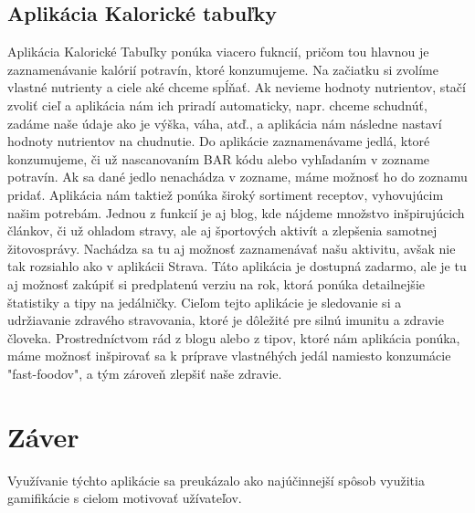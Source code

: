 \documentclass[10pt,twoside,slovak,a4paper]{article}
\begin{document}
\subsection{Aplikácia Kalorické tabuľky}
Aplikácia Kalorické Tabuľky ponúka viacero fukncií, pričom tou hlavnou je zaznamenávanie kalórií potravín, ktoré konzumujeme. Na začiatku si zvolíme vlastné nutrienty a ciele aké chceme spĺňať. Ak nevieme hodnoty nutrientov, stačí zvoliť cieľ a aplikácia nám ich priradí automaticky, napr. chceme schudnúť, zadáme naše údaje ako je výška, váha, atď., a aplikácia nám následne nastaví hodnoty nutrientov na chudnutie. Do aplikácie zaznamenávame jedlá, ktoré konzumujeme, či už nascanovaním BAR kódu alebo vyhľadaním v zozname potravín. Ak sa dané jedlo nenachádza v zozname, máme možnosť ho do zoznamu pridať. Aplikácia nám taktiež ponúka široký sortiment receptov, vyhovujúcim našim potrebám. Jednou z funkcií je aj blog, kde nájdeme množstvo inšpirujúcich článkov, či už ohladom stravy, ale aj športových aktivít a zlepšenia samotnej žitovosprávy. Nachádza sa tu aj možnosť zaznamenávať našu aktivitu, avšak nie tak rozsiahlo ako v aplikácii Strava. Táto aplikácia je dostupná zadarmo, ale je tu aj možnosť zakúpiť si predplatenú verziu na rok, ktorá ponúka detailnejšie štatistiky a tipy na jedálničky.
Cieľom tejto aplikácie je sledovanie si a udržiavanie zdravého stravovania, ktoré je dôležité pre silnú imunitu a zdravie človeka. Prostredníctvom rád z blogu alebo z tipov, ktoré nám aplikácia ponúka, máme možnosť inšpirovať sa k príprave vlastnéhých jedál namiesto konzumácie "fast-foodov", a tým zároveň zlepšiť naše zdravie.






\section{Záver} \label{zaver} 
Využívanie týchto aplikácie sa preukázalo ako najúčinnejší spôsob využitia gamifikácie s cielom motivovať užívateľov.



\nocite{Bunturo:EGHFMA}
\nocite{Wijaya:DGCycling}


\end{document}

